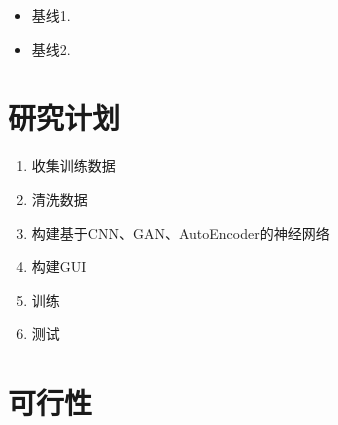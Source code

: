 \documentclass{article}
\begin{document}
\begin{itemize}

\item 基线1.

\item 基线2.

\end{itemize}

\section{研究计划}

\begin{enumerate}
	\item 收集训练数据
	\item 清洗数据
	\item 构建基于CNN、GAN、AutoEncoder的神经网络
	\item 构建GUI
	\item 训练
	\item 测试
\end{enumerate}

\section{可行性}
\end{document}
